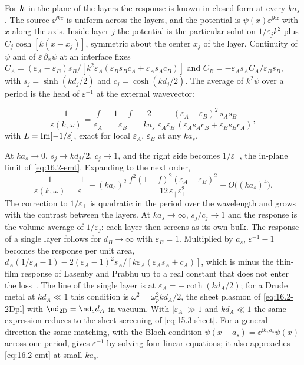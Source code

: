 For $\bm{k}$ in the plane of the layers the response is known in closed form at every $ka_s$. The source $\ee^{\ii kz}$ is uniform across the layers, and the potential is $\psi(x)\ee^{\ii kz}$ with $x$ along the axis. Inside layer $j$ the potential is the particular solution $1/\varepsilon_jk^2$ plus $C_j\cosh[k(x - x_j)]$, symmetric about the center $x_j$ of the layer. Continuity of $\psi$ and of $\varepsilon\,\partial_x\psi$ at an interface fixes $C_A = (\varepsilon_A - \varepsilon_B)s_B/[k^2\varepsilon_A(\varepsilon_Bs_Bc_A + \varepsilon_As_Ac_B)]$ and $C_B = -\varepsilon_As_AC_A/\varepsilon_Bs_B$, with $s_j = \sinh(kd_j/2)$ and $c_j = \cosh(kd_j/2)$. The average of $k^2\psi$ over a period is the head of $\varepsilon^{-1}$ at the external wavevector:
\begin{keyresult}
\begin{equation}
  \frac{1}{\varepsilon(k,\omega)} = \frac{f}{\varepsilon_A} + \frac{1 - f}{\varepsilon_B} - \frac{2}{ka_s}\,\frac{(\varepsilon_A - \varepsilon_B)^2\,s_As_B}{\varepsilon_A\varepsilon_B\,(\varepsilon_As_Ac_B + \varepsilon_Bs_Bc_A)} ,
  \label{eq:16.2-inplane}
\end{equation}
with $L = \operatorname{Im}[-1/\varepsilon]$, exact for local $\varepsilon_A$, $\varepsilon_B$ at any $ka_s$.
\end{keyresult}
\noindent At $ka_s \to 0$, $s_j \to kd_j/2$, $c_j \to 1$, and the right side becomes $1/\varepsilon_\perp$, the in-plane limit of \cref{eq:16.2-emt}. Expanding to the next order,
\begin{equation}
  \frac{1}{\varepsilon(k,\omega)} = \frac{1}{\varepsilon_\perp} + (ka_s)^2\,\frac{f^2(1 - f)^2(\varepsilon_A - \varepsilon_B)^2}{12\,\varepsilon_\parallel\,\varepsilon_\perp^2} + O\bigl((ka_s)^4\bigr) .
  \label{eq:16.2-corr}
\end{equation}
The correction to $1/\varepsilon_\perp$ is quadratic in the period over the wavelength and grows with the contrast between the layers. At $ka_s \to \infty$, $s_j/c_j \to 1$ and the response is the volume average of $1/\varepsilon_j$: each layer then screens as its own bulk. The response of a single layer follows for $d_B \to \infty$ with $\varepsilon_B = 1$. Multiplied by $a_s$, $\varepsilon^{-1} - 1$ becomes the response per unit area, $d_A(1/\varepsilon_A - 1) - 2(\varepsilon_A - 1)^2s_A/[k\varepsilon_A(\varepsilon_As_A + c_A)]$, which is minus the thin-film response of Lasenby and Prabhu up to a real constant that does not enter the loss~\cite[Eq.~(19)]{lasenby2022dark}. The line of the single layer is at $\varepsilon_A = -\coth(kd_A/2)$; for a Drude metal at $kd_A \ll 1$ this condition is $\omega^2 = \omega_p^2kd_A/2$, the sheet plasmon of \cref{eq:16.2-2Dpl} with $\nd_{\mathrm{2D}} = \nd_ed_A$ in vacuum. With $|\varepsilon_A| \gg 1$ and $kd_A \ll 1$ the same expression reduces to the sheet screening of \cref{eq:15.3-sheet}. For a general direction the same matching, with the Bloch condition $\psi(x + a_s) = \ee^{\ii k_xa_s}\psi(x)$ across one period, gives $\varepsilon^{-1}$ by solving four linear equations; it also approaches \cref{eq:16.2-emt} at small $ka_s$.

